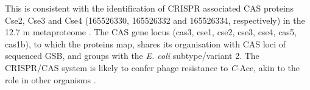 This is consistent with the identification of \ac{CRISPR} associated \ac{CAS} proteins Cse2, Cse3 and Cse4 (165526330, 165526332 and 165526334, respectively) in the 12.7 m metaproteome . 
The \ac{CAS} gene locus (cas3, cse1, cse2, cse3, cse4, cas5, cas1b), to which the proteins map, shares its organisation with \ac{CAS} loci of sequenced \ac{GSB}, and groups with the \emph{E. coli} subtype/variant 2. The \ac{CRISPR}/\ac{CAS} system is likely to confer phage resistance to \emph{C}-Ace, akin to the role in other organisms \cite{Karginov2010, Horvath2010}.





